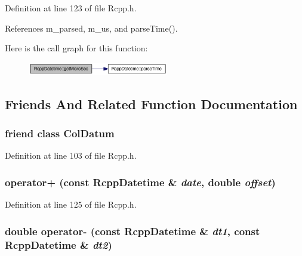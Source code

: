 Definition at line 123 of file Rcpp.h.

References m\_\-parsed, m\_\-us, and parseTime().

Here is the call graph for this function:\nopagebreak
\begin{figure}[H]
\begin{center}
\leavevmode
\includegraphics[width=174pt]{classRcppDatetime_cdf9e19f28c84fde38c352df5f225999_cgraph}
\end{center}
\end{figure}


\subsection{Friends And Related Function Documentation}
\hypertarget{classRcppDatetime_2740dcf7de2c2f5471d8fa18944a98d7}{
\subsubsection[ColDatum]{\setlength{\rightskip}{0pt plus 5cm}friend class {\bf ColDatum}}}
\label{classRcppDatetime_2740dcf7de2c2f5471d8fa18944a98d7}




Definition at line 103 of file Rcpp.h.\hypertarget{classRcppDatetime_29513e04f8cb90b2a7efea97f8cbd37a}{
\subsubsection[operator+]{ operator+ (const {\bf RcppDatetime} \& {\em date}, \/  double {\em offset})}}
\label{classRcppDatetime_29513e04f8cb90b2a7efea97f8cbd37a}




Definition at line 125 of file Rcpp.h.\hypertarget{classRcppDatetime_946df17f9ce3c423518d0db74e2bbbc4}{
\subsubsection[operator-]{\setlength{\rightskip}{0pt plus 5cm}double operator- (const {\bf RcppDatetime} \& {\em dt1}, \/  const {\bf RcppDatetime} \& {\em dt2})}}
\label{classRcppDatetime_946df17f9ce3c423518d0db74e2bbbc4}




